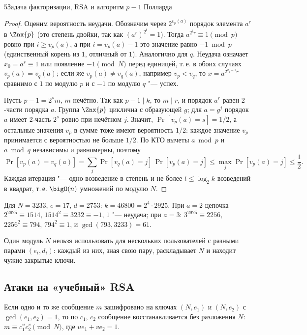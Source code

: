 \begin{lecture}{5}{Задача факторизации, RSA и алгоритм \texorpdfstring{$p - 1$}{p - 1} Полларда}
\begin{proof}
Оценим вероятность неудачи. Обозначим через $2^{v_p(a)}$ порядок элемента $a^r$ в $\Znx{p}$
(это степень двойки, так как $(a^r)^{2^t} = 1$). Тогда
$a^{2^i r} \equiv 1 \pmod p$ ровно при $i \ge v_p(a)$, а при $i = v_p(a) - 1$ это значение
равно $-1 \bmod p$ (единственный корень из $1$, отличный от $1$). Аналогично для $q$.
Неудача означает $x_0 = a^r \equiv 1$ или появление $-1 \pmod N$ перед единицей, т.\,е.
в обоих случаях $v_p(a) = v_q(a)$; если же $v_p(a) \ne v_q(a)$, например $v_p < v_q$,
то $x = a^{2^{v_q - 1} r}$ сравнимо с $1$ по модулю $p$ и с $-1$ по модулю $q$ "--- успех.

Пусть $p - 1 = 2^{s} m$, $m$ нечётно. Так как $p - 1 \mid k$, то $m \mid r$, и порядок $a^r$
равен $2$-части порядка $a$. Группа $\Znx{p}$ циклична с образующей $g$; для $a = g^j$
порядок $a$ имеет $2$-часть $2^{s}$ ровно при нечётном $j$. Значит,
$\Pr[v_p(a) = s] = 1/2$, а остальные значения $v_p$ в сумме тоже имеют вероятность $1/2$:
каждое значение $v_p$ принимается с вероятностью не больше $1/2$. По КТО вычеты $a \bmod p$ и $a \bmod q$ независимы и равномерны, поэтому
\[
  \Pr[v_p(a) = v_q(a)] = \sum_{j} \Pr[v_q(a) = j]\,\Pr[v_p(a) = j]
  \le \max_j \Pr[v_p(a) = j] \le \frac12.
\]
Каждая итерация "--- одно возведение в степень и не более $t \le \log_2 k$ возведений
в квадрат, т.\,е. $\bigO(n)$ умножений по модулю $N$.
\end{proof}

Для $N = 3233$, $e = 17$, $d = 2753$: $k = 46800 = 2^4 \cdot 2925$. При $a = 2$ цепочка
$2^{2925} \equiv 1514$, $1514^2 \equiv 3232 \equiv -1$, $1$ "--- неудача; при $a = 3$:
$3^{2925} \equiv 2256$, $2256^2 \equiv 794$, $794^2 \equiv 1$, и $\gcd(793, 3233) = 61$.


\begin{corollary}
Один модуль $N$ нельзя использовать для нескольких пользователей с разными парами $(e_i, d_i)$:
каждый из них, зная свою пару, раскладывает $N$ и находит чужие закрытые ключи.
\end{corollary}

\subsection{Атаки на «учебный» RSA}

\begin{proposition}\label{l5:common-modulus}
Если одно и то же сообщение $m$ зашифровано на ключах $(N, e_1)$ и $(N, e_2)$ с
$\gcd(e_1, e_2) = 1$, то по $c_1$, $c_2$ сообщение восстанавливается без разложения $N$:
$m \equiv c_1^{u} c_2^{v} \pmod N$, где $u e_1 + v e_2 = 1$.
\end{proposition}


\end{lecture}
